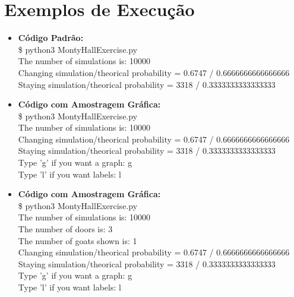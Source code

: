 \documentclass{article}
\begin{document}
\section{Exemplos de Execução}
\begin{itemize}
    \item \textbf{Código Padrão:}\\
            \$ python3 MontyHallExercise.py\\
            The number of simulations is: 10000\\
            Changing simulation/theorical probability = 0.6747 / 0.6666666666666666\\
            Staying simulation/theorical probability = 3318 / 0.3333333333333333
    \item \textbf{Código com Amostragem Gráfica:}\\
            \$ python3 MontyHallExercise.py\\
            The number of simulations is: 10000\\
            Changing simulation/theorical probability = 0.6747 / 0.6666666666666666\\
            Staying simulation/theorical probability = 3318 / 0.3333333333333333\\
            Type 'g' if you want a graph: g\\
            Type 'l' if you want labels: l
        \item \textbf{Código com Amostragem Gráfica:}\\
            \$ python3 MontyHallExercise.py\\
            The number of simulations is: 10000\\
            The number of doors is: 3\\
            The number of goats shown is: 1\\
            Changing simulation/theorical probability = 0.6747 / 0.6666666666666666\\
            Staying simulation/theorical probability = 3318 / 0.3333333333333333\\
            Type 'g' if you want a graph: g\\
            Type 'l' if you want labels: l

\end{itemize}
\end{document}
